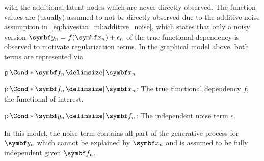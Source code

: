 with the additional latent nodes
which are never directly observed.
The function values are (usually) assumed to not be directly observed due to the additive noise assumption in~\cref{eq:bayesian_ml:additive_noise}, which states that only a noisy version $\mat{y}_n = f(\mat{x}_n) + \epsilon_n$ of the true functional dependency is observed to motivate regularization terms.
In the graphical model above, both terms are represented via
\begin{labeling}{$\Prob*{\mat{f}_n \given \mat{x}_n}$}
    \item [$\Prob*{\mat{f}_n \given \mat{x}_n}$:] The true functional dependency $f$, the functional of interest.
    \item [$\Prob*{\mat{y}_n \given \mat{f}_n}$:] The independent noise term $\epsilon$.
\end{labeling}
In this model, the noise term contains all part of the generative process for $\mat{y}_n$ which cannot be explained by $\mat{x}_n$ and is assumed to be fully independent given $\mat{f}_n$.

